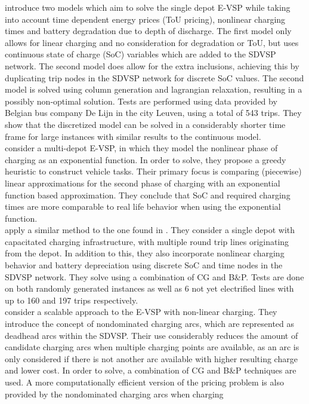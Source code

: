 \documentclass[]{article}
\begin{document}
 introduce two models which aim to solve the single depot E-VSP
while taking into account time dependent energy prices (ToU pricing), nonlinear charging times and
battery degradation due to depth of discharge. The first model only allows for linear charging and no consideration for degradation or ToU, but uses continuous state of charge (SoC) variables which are added to the SDVSP network. The second model does allow for the extra inclusions, achieving this by duplicating trip nodes in the SDVSP network for discrete SoC values. The second model is solved using column generation and lagrangian relaxation, resulting in a possibly non-optimal solution. Tests are performed using data provided by Belgian bus company De Lijn in the city Leuven, using a total of 543 trips. They show that the
discretized model can be solved in a considerably shorter time frame for large instances with similar results to
the continuous model. \\
\citet{Olsen2020} consider a multi-depot E-VSP, in which they model the nonlinear phase of charging as an exponential function. In order to solve, they propose a greedy heuristic to construct vehicle tasks. Their primary focus is comparing (piecewise) linear approximations for the second phase of charging with an exponential function based approximation. They conclude that SoC and required charging times are more comparable to real life behavior when using the exponential function. \\
\citet{Zhang2021} apply a similar method to the one found in . They consider a single depot with capacitated charging infrastructure,
with multiple round trip lines originating from the depot. In addition to this, they also incorporate nonlinear charging behavior and battery depreciation using discrete SoC and time nodes in the SDVSP network. They solve using a combination of CG and B\&P. Tests are done on both randomly generated instances as well as 6 not yet electrified lines with up to 160 and 197 trips
respectively.\\
\citet{Parmentier2023} consider a scalable approach to the E-VSP with non-linear charging. They introduce the concept of nondominated charging arcs, which are represented as deadhead arcs within the SDVSP. Their use considerably reduces the amount of candidate charging arcs when multiple charging points are available, as an arc is only considered if there is not another arc available with higher resulting charge and lower cost. In order to solve, a combination of CG and B\&P techniques are used. A more computationally efficient version of the pricing problem is also provided by the nondominated charging arcs when charging
\end{document}
